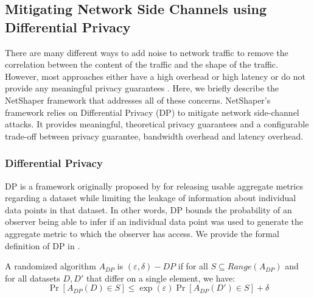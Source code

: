 \subsection{Mitigating Network Side Channels using Differential Privacy}
\label{subsec:netshaper-background-framework}

There are many different ways to add noise to network traffic to remove the correlation between the content of the traffic and the shape of the traffic.
However, most approaches either have a high overhead or high latency \cite{cai2014csbuflo, mehta2022pacer} or do not provide any meaningful privacy guarantees \cite{hou2020wf, nasr2021blind, rahman2020mockingbird, shan2021dolos, wang2017walkie, wright2009traffic}.
Here, we briefly describe the NetShaper framework that addresses all of these concerns.
NetShaper's framework relies on Differential Privacy (DP) to mitigate network side-channel attacks.
It provides meaningful, theoretical privacy guarantees and a configurable trade-off between privacy guarantee, bandwidth overhead and latency overhead.

\subsubsection{Differential Privacy}
\label{subsubsec:netshaper-background-framework-dp}
DP is a framework originally proposed by \citet{dwork2006differential} for releasing usable aggregate metrics regarding a dataset while limiting the leakage of information about individual data points in that dataset.
In other words, DP bounds the probability of an observer being able to infer if an individual data point was used to generate the aggregate metric to which the observer has access.
We provide the formal definition of DP in . 

\begin{definition}
  \label{def:dp}
  A randomized algorithm $A_{DP}$ is $(\varepsilon, \delta)-DP$ if for all ${S} \subseteq Range(A_{DP})$ and for all datasets $D, D'$ that differ on a single element, we have:
  \begin{equation*}
    \Pr[A_{DP}(D) \in S] \leq \exp(\varepsilon)\Pr[A_{DP}(D') \in S] + \delta
  \end{equation*}
\end{definition}

